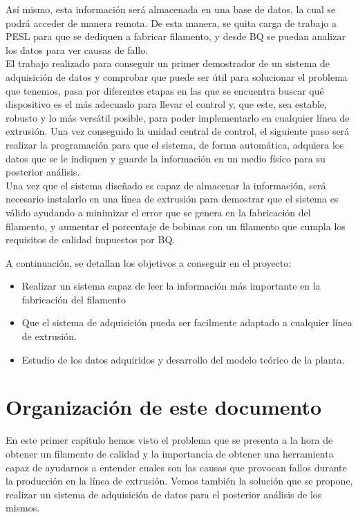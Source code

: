 Así mismo, esta información será almacenada en una base de datos, la cual se podrá acceder de manera remota. De esta manera, se quita carga de trabajo a PESL para que se dediquen a fabricar filamento, y desde BQ se puedan analizar los datos para ver causas de fallo.\\

El trabajo realizado para conseguir un primer demostrador de un sistema de adquisición de datos y comprobar que puede ser útil para solucionar el problema que tenemos, pasa por diferentes etapas en las que se encuentra buscar qué dispositivo es el más adecuado para llevar el control y, que este, sea estable, robusto y lo más versátil posible, para poder implementarlo en cualquier línea de extrusión. Una vez conseguido la unidad central de control, el siguiente paso será realizar la programación para que el sistema, de forma automática, adquiera los datos que se le indiquen y guarde la información en un medio físico para su posterior análisis.\\

Una vez que el sistema diseñado es capaz de almacenar la información, será necesario instalarlo en una línea de extrusión para demostrar que el sistema es válido ayudando a minimizar el error que se genera en la fabricación del filamento, y aumentar el porcentaje de bobinas con un filamento que cumpla los requisitos de calidad impuestos por BQ.

A continuación, se detallan los objetivos a conseguir en el proyecto:

\begin{itemize}
    \item Realizar un sistema capaz de leer la información más importante en la fabricación del filamento
    \item Que el sistema de adquisición pueda ser facilmente adaptado a cualquier línea de extrusión.
    \item Estudio de los datos adquiridos y desarrollo del modelo teórico de la planta.
\end{itemize}
\label{Listado_objetivos}

\section{Organización de este documento}
\label{sec:organizacion}

En este primer capítulo hemos visto el problema que se presenta a la hora de obtener un filamento de calidad y la importancia de obtener una herramienta capaz de ayudarnos a entender cuales son las causas que provocan fallos durante la producción en la línea de extrusión. Vemos también la solución que se propone, realizar un sistema de adquisición de datos para el posterior análisis de los mismos.\\

